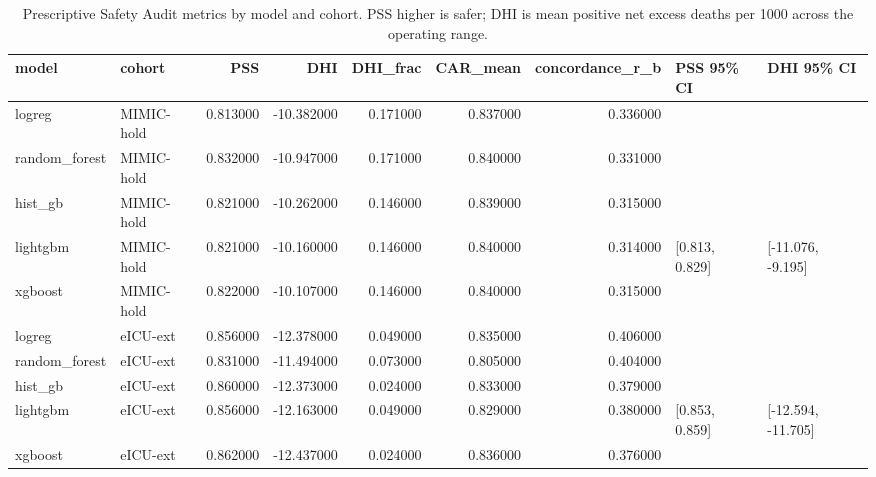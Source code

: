\begin{table}
\caption{Prescriptive Safety Audit metrics by model and cohort. PSS higher is safer; DHI is mean positive net excess deaths per 1000 across the operating range.}
\label{tab:prescriptive}
\begin{tabular}{llrrrrrll}
\toprule
model & cohort & PSS & DHI & DHI\_frac & CAR\_mean & concordance\_r\_b & PSS 95\% CI & DHI 95\% CI \\
\midrule
logreg & MIMIC-hold & 0.813000 & -10.382000 & 0.171000 & 0.837000 & 0.336000 &  &  \\
random\_forest & MIMIC-hold & 0.832000 & -10.947000 & 0.171000 & 0.840000 & 0.331000 &  &  \\
hist\_gb & MIMIC-hold & 0.821000 & -10.262000 & 0.146000 & 0.839000 & 0.315000 &  &  \\
lightgbm & MIMIC-hold & 0.821000 & -10.160000 & 0.146000 & 0.840000 & 0.314000 & [0.813, 0.829] & [-11.076, -9.195] \\
xgboost & MIMIC-hold & 0.822000 & -10.107000 & 0.146000 & 0.840000 & 0.315000 &  &  \\
logreg & eICU-ext & 0.856000 & -12.378000 & 0.049000 & 0.835000 & 0.406000 &  &  \\
random\_forest & eICU-ext & 0.831000 & -11.494000 & 0.073000 & 0.805000 & 0.404000 &  &  \\
hist\_gb & eICU-ext & 0.860000 & -12.373000 & 0.024000 & 0.833000 & 0.379000 &  &  \\
lightgbm & eICU-ext & 0.856000 & -12.163000 & 0.049000 & 0.829000 & 0.380000 & [0.853, 0.859] & [-12.594, -11.705] \\
xgboost & eICU-ext & 0.862000 & -12.437000 & 0.024000 & 0.836000 & 0.376000 &  &  \\
\bottomrule
\end{tabular}
\end{table}
